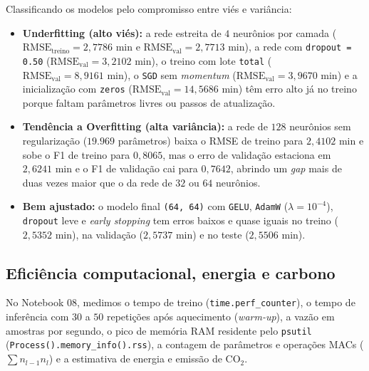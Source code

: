 \documentclass[12pt,a4paper]{article}
\begin{document}
Classificando os modelos pelo compromisso entre viés e variância:
\begin{itemize}
    \item \textbf{Underfitting (alto viés):} a rede estreita de $4$ neurônios por camada ($\text{RMSE}_{\text{treino}} = 2{,}7786\text{ min}$ e $\text{RMSE}_{\text{val}} = 2{,}7713\text{ min}$), a rede com \texttt{dropout = 0.50} ($\text{RMSE}_{\text{val}} = 3{,}2102\text{ min}$), o treino com lote \texttt{total} ($\text{RMSE}_{\text{val}} = 8{,}9161\text{ min}$), o \texttt{SGD} sem \textit{momentum} ($\text{RMSE}_{\text{val}} = 3{,}9670\text{ min}$) e a inicialização com \texttt{zeros} ($\text{RMSE}_{\text{val}} = 14{,}5686\text{ min}$) têm erro alto já no treino porque faltam parâmetros livres ou passos de atualização.
    \item \textbf{Tendência a Overfitting (alta variância):} a rede de $128$ neurônios sem regularização ($19.969$ parâmetros) baixa o RMSE de treino para $2{,}4102\text{ min}$ e sobe o F1 de treino para $0{,}8065$, mas o erro de validação estaciona em $2{,}6241\text{ min}$ e o F1 de validação cai para $0{,}7642$, abrindo um \textit{gap} mais de duas vezes maior que o da rede de $32$ ou $64$ neurônios.
    \item \textbf{Bem ajustado:} o modelo final \texttt{(64, 64)} com \texttt{GELU}, \texttt{AdamW} ($\lambda = 10^{-4}$), \texttt{dropout} leve e \textit{early stopping} tem erros baixos e quase iguais no treino ($2{,}5352\text{ min}$), na validação ($2{,}5737\text{ min}$) e no teste ($2{,}5506\text{ min}$).
\end{itemize}

\subsection{Eficiência computacional, energia e carbono}

No Notebook 08, medimos o tempo de treino (\texttt{time.perf\_counter}), o tempo de inferência com $30$ a $50$ repetições após aquecimento (\textit{warm-up}), a vazão em amostras por segundo, o pico de memória RAM residente pelo \texttt{psutil} (\texttt{Process().memory\_info().rss}), a contagem de parâmetros e operações MACs ($\sum n_{l-1} n_l$) e a estimativa de energia e emissão de $\text{CO}_2$.
\end{document}
